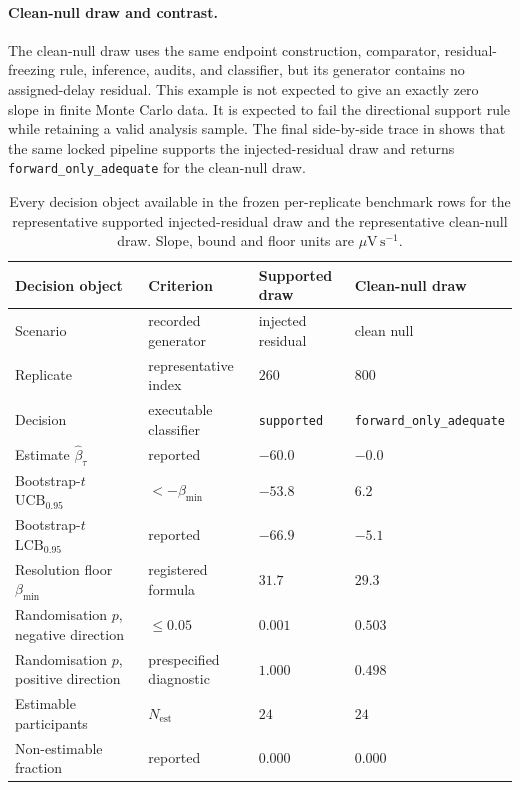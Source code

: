 \paragraph{Clean-null draw and contrast.}
The clean-null draw uses the same endpoint construction, comparator, residual-freezing rule, inference, audits, and classifier, but its generator contains no assigned-delay residual. This example is not expected to give an exactly zero slope in finite Monte Carlo data. It is expected to fail the directional support rule while retaining a valid analysis sample. The final side-by-side trace in  shows that the same locked pipeline supports the injected-residual draw and returns \texttt{forward\_only\_adequate} for the clean-null draw.

\begin{table}[t]
\centering
\caption{Every decision object available in the frozen per-replicate benchmark rows for the representative supported injected-residual draw and the representative clean-null draw. Slope, bound and floor units are \(\mu\mathrm{V\,s^{-1}}\).}
\label{tab:si-worked-decision}
\footnotesize
\setlength{\tabcolsep}{3.5pt}
\begin{tabularx}{\textwidth}{@{}p{3.9cm}p{3.0cm}p{3.0cm}p{3.0cm}@{}}
\toprule
Decision object & Criterion & Supported draw & Clean-null draw \\
\midrule
Scenario & recorded generator & injected residual & clean null \\
Replicate & representative index & \(260\) & \(800\) \\
Decision & executable classifier & \texttt{supported} & \texttt{forward\_only\_adequate} \\
Estimate \(\widehat\beta_\tau\) & reported & \(-60.0\) & \(-0.0\) \\
Bootstrap-\(t\) \(\mathrm{UCB}_{0.95}\) & \(<-\beta_{\min}\) & \(-53.8\) & \(6.2\) \\
Bootstrap-\(t\) \(\mathrm{LCB}_{0.95}\) & reported & \(-66.9\) & \(-5.1\) \\
Resolution floor \(\beta_{\min}\) & registered formula & \(31.7\) & \(29.3\) \\
Randomisation \(p\), negative direction & \(\le 0.05\) & \(0.001\) & \(0.503\) \\
Randomisation \(p\), positive direction & prespecified diagnostic & \(1.000\) & \(0.498\) \\
Estimable participants & \(N_{\mathrm{est}}\) & \(24\) & \(24\) \\
Non-estimable fraction & reported & \(0.000\) & \(0.000\) \\

\end{tabularx}
\end{table}
